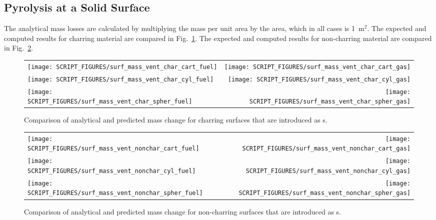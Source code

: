 \documentclass[11pt]{book}
\begin{document}
\subsection{Pyrolysis at a Solid Surface}
\label{surf_mass_vent_char_cart_fuel}
\label{surf_mass_vent_char_cart_gas}
\label{surf_mass_vent_char_cyl_fuel}
\label{surf_mass_vent_char_cyl_gas}
\label{surf_mass_vent_char_spher_fuel}
\label{surf_mass_vent_char_spher_gas}
\label{surf_mass_vent_nonchar_cart_fuel}
\label{surf_mass_vent_nonchar_cart_gas}
\label{surf_mass_vent_nonchar_cyl_fuel}
\label{surf_mass_vent_nonchar_cyl_gas}
\label{surf_mass_vent_nonchar_spher_fuel}
\label{surf_mass_vent_nonchar_spher_gas}

The analytical mass losses are calculated by multiplying the mass per unit area by the  area, which in all cases is 1~m$^2$. The expected and computed results for charring material are compared in Fig.~\ref{surf_mass_vent_char}. The expected and computed results for non-charring material are compared in Fig.~\ref{surf_mass_vent_nonchar}.

\begin{figure}[!htb]
\begin{tabular*}{\textwidth}{l@{\extracolsep{\fill}}r}
\texttt{[image: SCRIPT\_FIGURES/surf\_mass\_vent\_char\_cart\_fuel]} &
\texttt{[image: SCRIPT\_FIGURES/surf\_mass\_vent\_char\_cart\_gas]} \\
\texttt{[image: SCRIPT\_FIGURES/surf\_mass\_vent\_char\_cyl\_fuel]} &
\texttt{[image: SCRIPT\_FIGURES/surf\_mass\_vent\_char\_cyl\_gas]} \\
\texttt{[image: SCRIPT\_FIGURES/surf\_mass\_vent\_char\_spher\_fuel]} &
\texttt{[image: SCRIPT\_FIGURES/surf\_mass\_vent\_char\_spher\_gas]}
\end{tabular*}
\caption[The  test cases]{Comparison of analytical and predicted mass change for charring surfaces that are introduced as s.}
\label{surf_mass_vent_char}
\end{figure}

\begin{figure}[p]
\noindent
\begin{tabular*}{\textwidth}{l@{\extracolsep{\fill}}r}
\texttt{[image: SCRIPT\_FIGURES/surf\_mass\_vent\_nonchar\_cart\_fuel]} &
\texttt{[image: SCRIPT\_FIGURES/surf\_mass\_vent\_nonchar\_cart\_gas]} \\
\texttt{[image: SCRIPT\_FIGURES/surf\_mass\_vent\_nonchar\_cyl\_fuel]} &
\texttt{[image: SCRIPT\_FIGURES/surf\_mass\_vent\_nonchar\_cyl\_gas]} \\
\texttt{[image: SCRIPT\_FIGURES/surf\_mass\_vent\_nonchar\_spher\_fuel]} &
\texttt{[image: SCRIPT\_FIGURES/surf\_mass\_vent\_nonchar\_spher\_gas]}
\end{tabular*}
\caption[The  test cases]{Comparison of analytical and predicted mass change for non-charring surfaces that are introduced as s.}
\label{surf_mass_vent_nonchar}
\end{figure}
\end{document}
